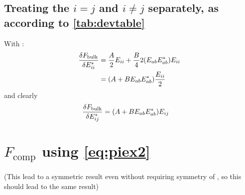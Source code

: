 \documentclass[11pt]{article}
\begin{document}
\subsection{Treating the $i=j$ and $i\neq j$ separately, as according to \cref{tab:devtable}}
With :
\begin{align}
    \fdv{F_\text{bulk}}{E_{ii}^*} &= \frac{A}{2}E_{ii} + \frac{B}{4} 2(E_{ab}E_{ab}^*)E_{ii} \\
    &= (A + B E_{ab}E_{ab}^*)\frac{E_{ii}}{2}
\end{align}
and clearly
\begin{align}
    \fdv{F_\text{bulk}}{E_{ij}^*} &= (A + B E_{ab}E_{ab}^*) E_{ij}
\end{align}

\pagebreak
\section{$F_\text{comp}$ using \cref{eq:piex2}}
(This lead to a symmetric result even without requiring symmetry of \EE, so this should lead to the same result)
\end{document}

